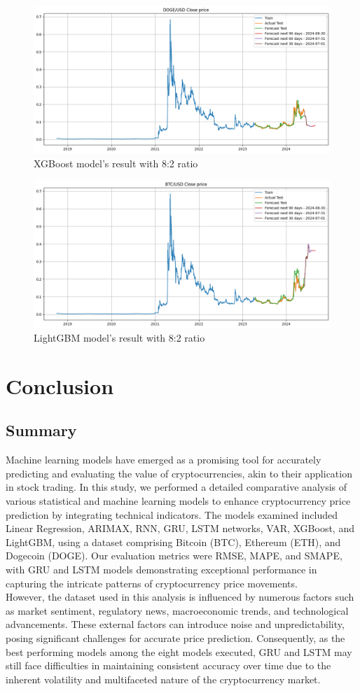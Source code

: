 \documentclass{ieeeojies}
\begin{document}
\begin{figure}[H]
    \centering
    \includegraphics[width=0.8\linewidth]{./././visualize/XGBoost/DOGE-80-20.png}
    \caption{XGBoost model’s result with 8:2 ratio}
    \label{fig:35}
\end{figure}
\begin{figure}[H]
    \centering
    \includegraphics[width=0.8\linewidth]{./././visualize/LightGBM/DOGE-80-20.png}
    \caption{LightGBM model’s result with 8:2 ratio}
    \label{fig:36}
\end{figure}
\section{Conclusion}
\subsection{Summary}
Machine learning models have emerged as a promising tool for accurately predicting and evaluating the value of cryptocurrencies, akin to their application in stock trading. In this study, we performed a detailed comparative analysis of various statistical and machine learning models to enhance cryptocurrency price prediction by integrating technical indicators. The models examined included Linear Regression, ARIMAX, RNN, GRU, LSTM networks, VAR, XGBoost, and LightGBM, using a dataset comprising Bitcoin (BTC), Ethereum (ETH), and Dogecoin (DOGE). Our evaluation metrics were RMSE, MAPE, and SMAPE, with GRU and LSTM models demonstrating exceptional performance in capturing the intricate patterns of cryptocurrency price movements.\\
However, the dataset used in this analysis is influenced by numerous factors such as market sentiment, regulatory news, macroeconomic trends, and technological advancements. These external factors can introduce noise and unpredictability, posing significant challenges for accurate price prediction. Consequently, as the best performing models among the eight models executed, GRU and LSTM may still face difficulties in maintaining consistent accuracy over time due to the inherent volatility and multifaceted nature of the cryptocurrency market.
\end{document}

